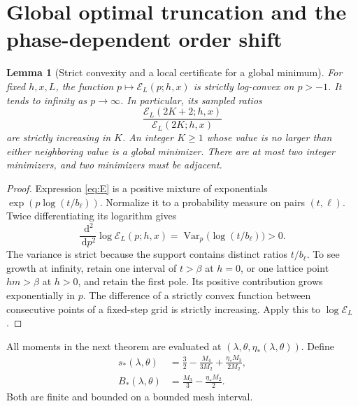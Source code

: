 \documentclass[11pt,a4paper]{article}
\numberwithin{equation}{section}
\newtheorem{lemma}[theorem]{Lemma}
\theoremstyle{definition}\newtheorem{definition}[theorem]{Definition}
\theoremstyle{remark}\newtheorem{remark}[theorem]{Remark}
\newcommand{\dd}{\,\mathrm d}
\newcommand{\calE}{\mathcal E}
\DeclareMathOperator{\Var}{Var}
\begin{document}
\section{Global optimal truncation and the phase-dependent order shift}
\label{sec:optimization}

\begin{lemma}[Strict convexity and a local certificate for a global minimum]
\label{lem:convex}
For fixed $h,x,L$, the function $p\mapsto\calE_L(p;h,x)$ is strictly
log-convex on $p>-1$. It tends to infinity as $p\to\infty$. In particular,
its sampled ratios
\begin{equation}
 \frac{\calE_L(2K+2;h,x)}{\calE_L(2K;h,x)}
 \label{eq:ratio}
\end{equation}
are strictly increasing in $K$. An integer $K\ge1$ whose value is no larger
than either neighboring value is a global minimizer. There are at most two
integer minimizers, and two minimizers must be adjacent.
\end{lemma}
\begin{proof}
Expression \eqref{eq:E} is a positive mixture of exponentials
$\exp(p\log(t/b_\ell))$. Normalize it to a probability measure on pairs
$(t,\ell)$. Twice differentiating its logarithm gives
\[
 \frac{\dd^2}{\dd p^2}\log\calE_L(p;h,x)
 =\Var_p\bigl(\log(t/b_\ell)\bigr)>0.
\]
The variance is strict because the support contains distinct ratios
$t/b_\ell$. To see growth at infinity, retain one interval of $t>\beta$
at $h=0$, or one lattice point $hm>\beta$ at $h>0$, and retain the first
pole. Its positive contribution grows exponentially in $p$.
The difference of a strictly convex function between consecutive points
of a fixed-step grid is strictly increasing. Apply this to $\log\calE_L$.
\end{proof}

All moments in the next theorem are evaluated at
$(\lambda,\theta,\eta_*(\lambda,\theta))$. Define
\begin{align}
 s_*(\lambda,\theta)
   &=\frac32-\frac{M_4}{3M_2}+\frac{\eta_*M_3}{2M_2},
 \label{eq:sstar}\\
 B_*(\lambda,\theta)
   &=\frac{M_3}{3}-\frac{\eta_*M_2}{2}.
 \label{eq:Bstar}
\end{align}
Both are finite and bounded on a bounded mesh interval.
\end{document}
